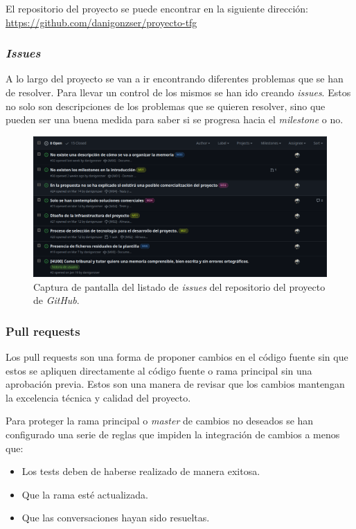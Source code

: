 El repositorio del proyecto se puede encontrar en la siguiente dirección: \url{https://github.com/danigonzser/proyecto-tfg}

\subsubsection{\textit{Issues}}

A lo largo del proyecto se van a ir encontrando diferentes problemas que se han de resolver. Para llevar un control de los mismos se han ido creando \textit{issues}. Estos no solo son descripciones de los problemas que se quieren resolver, sino que pueden ser una buena medida para saber si se progresa hacia el \textit{milestone} o no.

\begin{figure}[H]
    \caption{Captura de pantalla del listado de \textit{issues} del repositorio del proyecto de \textit{GitHub}.}
    \centering
    \vspace*{0.5cm}
    \includegraphics[scale=0.2]{figuras/github_issues.png}
\end{figure}

\subsubsection{Pull requests}

Los pull requests son una forma de proponer cambios en el código fuente sin que estos se apliquen directamente al código fuente o rama principal sin una aprobación previa. Estos son una manera de revisar que los cambios mantengan la excelencia técnica y calidad del proyecto.

Para proteger la rama principal o \textit{master} de cambios no deseados se han configurado una serie de reglas que impiden la integración de cambios a menos que:

\begin{itemize}
    \item Los tests deben de haberse realizado de manera exitosa.
    \item Que la rama esté actualizada.
    \item Que las conversaciones hayan sido resueltas.
\end{itemize}

